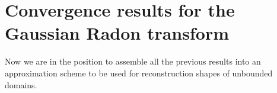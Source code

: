 

\section{Convergence results for the Gaussian Radon transform}

Now we are in the position to assemble all the previous results into an approximation scheme to be used for reconstruction shapes of unbounded domains.

